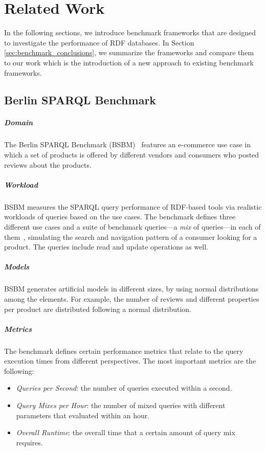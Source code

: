 \chapter{Related Work}

In the following sections, we introduce benchmark frameworks that are designed to investigate the performance of RDF databases. In Section \ref{sec:benchmark_conclusions}, we summarize the frameworks and compare them to our work which is the introduction of a new approach to existing benchmark frameworks.

\section{Berlin SPARQL Benchmark}

\paragraph{Domain}
The Berlin SPARQL Benchmark (BSBM)~\cite{berlin} features an e-commerce use case in which a set of products is offered by different vendors and consumers who posted reviews about the products. 

\paragraph{Workload}
BSBM measures the SPARQL query performance of RDF-based tools via realistic workloads of queries based on the use cases. The benchmark defines three different use cases and a suite of benchmark queries---a \textit{mix} of queries---in each of them~\cite{berlin_specification}, simulating the search and navigation pattern of a consumer looking for a product. The queries include read and update operations as well.

\paragraph{Models}
BSBM generates artificial models in different sizes, by using normal distributions among the elements. For example, the number of reviews and different properties per product are distributed following a normal distribution.

\paragraph{Metrics}
The benchmark defines certain performance metrics that relate to the query execution times from different perspectives. The most important metrics are the following:
\begin{itemize}
	\item{\textit{Queries per Second}}: the number of queries executed within a second.
	\item{\textit{Query Mixes per Hour}}: the number of mixed queries with different parameters that evaluated within an hour.
	\item{\textit{Overall Runtime}}: the overall time that a certain amount of query mix requires.
\end{itemize}


